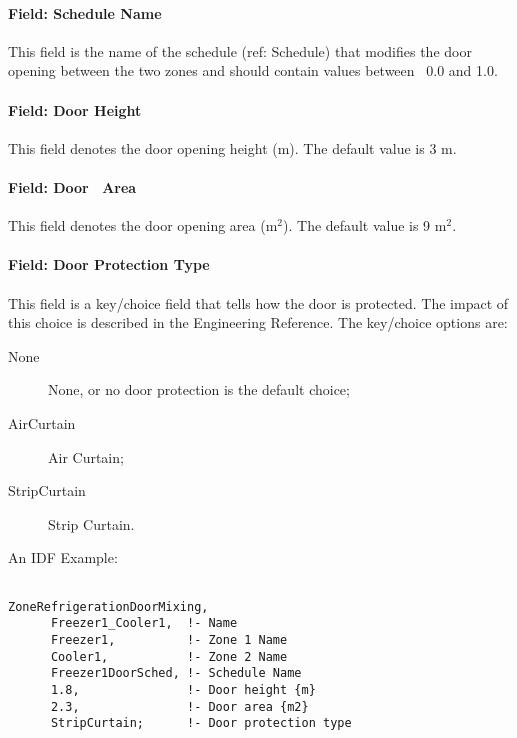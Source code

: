 \paragraph{Field: Schedule Name}\label{field-schedule-name-5}

This field is the name of the schedule (ref: Schedule) that modifies the door opening between the two zones and should contain values between~ 0.0 and 1.0.

\paragraph{Field: Door Height}\label{field-door-height}

This field denotes the door opening height (m). The default value is 3 m.

\paragraph{Field: Door~ Area}\label{field-door-area}

This field denotes the door opening area (m\(^{2}\)). The default value is 9 m\(^{2}\).

\paragraph{Field: Door Protection Type}\label{field-door-protection-type}

This field is a key/choice field that tells how the door is protected. The impact of this choice is described in the Engineering Reference. The key/choice options are:

\begin{description}

\item[None] None, or no door protection is the default choice;

\item[AirCurtain] Air Curtain;

\item[StripCurtain] Strip Curtain.

\end{description}

An IDF Example:

\begin{lstlisting}

ZoneRefrigerationDoorMixing,
      Freezer1_Cooler1,  !- Name
      Freezer1,          !- Zone 1 Name
      Cooler1,           !- Zone 2 Name
      Freezer1DoorSched, !- Schedule Name
      1.8,               !- Door height {m}
      2.3,               !- Door area {m2}
      StripCurtain;      !- Door protection type
\end{lstlisting}

